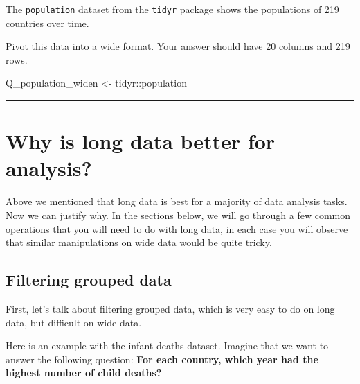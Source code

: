 \documentclass[
  letterpaper,
  DIV=11,
  numbers=noendperiod]{scrreprt}
\newenvironment{Shaded}{\begin{snugshade}}{\end{snugshade}}
\newcommand{\NormalTok}[1]{\textcolor[rgb]{0.00,0.23,0.31}{#1}}
\newcommand{\OtherTok}[1]{\textcolor[rgb]{0.00,0.23,0.31}{#1}}
\newcommand{\SpecialCharTok}[1]{\textcolor[rgb]{0.37,0.37,0.37}{#1}}
\begin{document}
\begin{tcolorbox}[enhanced jigsaw, title=\textcolor{quarto-callout-tip-color}{\faLightbulb}\hspace{0.5em}{Practice}, colbacktitle=quarto-callout-tip-color!10!white, leftrule=.75mm, arc=.35mm, opacityback=0, bottomrule=.15mm, rightrule=.15mm, toptitle=1mm, breakable, toprule=.15mm, colback=white, coltitle=black, colframe=quarto-callout-tip-color-frame, bottomtitle=1mm, titlerule=0mm, left=2mm, opacitybacktitle=0.6]

The \texttt{population} dataset from the \texttt{tidyr} package shows
the populations of 219 countries over time.

Pivot this data into a wide format. Your answer should have 20 columns
and 219 rows.

\begin{Shaded}
\begin{Highlighting}[]
\NormalTok{Q\_population\_widen }\OtherTok{\textless{}{-}} 
\NormalTok{  tidyr}\SpecialCharTok{::}\NormalTok{population}
\end{Highlighting}
\end{Shaded}

\end{tcolorbox}

\begin{center}\rule{0.5\linewidth}{0.5pt}\end{center}

\section{Why is long data better for
analysis?}\label{why-is-long-data-better-for-analysis}

Above we mentioned that long data is best for a majority of data
analysis tasks. Now we can justify why. In the sections below, we will
go through a few common operations that you will need to do with long
data, in each case you will observe that similar manipulations on wide
data would be quite tricky.

\subsection{Filtering grouped data}\label{filtering-grouped-data}

First, let's talk about filtering grouped data, which is very easy to do
on long data, but difficult on wide data.

Here is an example with the infant deaths dataset. Imagine that we want
to answer the following question: \textbf{For each country, which year
had the highest number of child deaths?}
\end{document}
